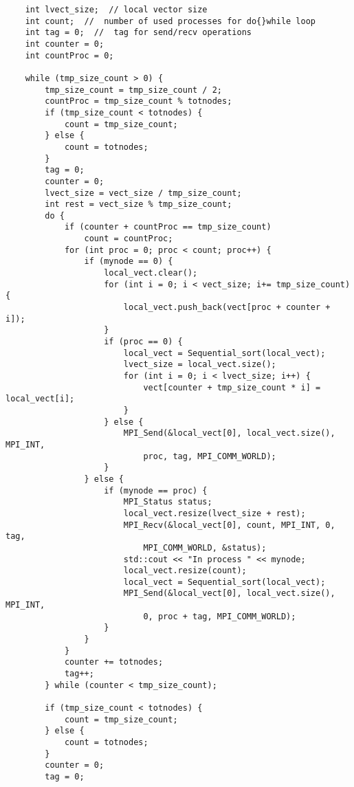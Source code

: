 \documentclass{report}
\begin{document}
\begin{verbatim}
    int lvect_size;  // local vector size
    int count;  //  number of used processes for do{}while loop
    int tag = 0;  //  tag for send/recv operations
    int counter = 0;
    int countProc = 0;

    while (tmp_size_count > 0) {
        tmp_size_count = tmp_size_count / 2;
        countProc = tmp_size_count % totnodes;
        if (tmp_size_count < totnodes) {
            count = tmp_size_count;
        } else {
            count = totnodes;
        }
        tag = 0;
        counter = 0;
        lvect_size = vect_size / tmp_size_count;
        int rest = vect_size % tmp_size_count;
        do {
            if (counter + countProc == tmp_size_count)
                count = countProc;
            for (int proc = 0; proc < count; proc++) {
                if (mynode == 0) {
                    local_vect.clear();
                    for (int i = 0; i < vect_size; i+= tmp_size_count) {
                        local_vect.push_back(vect[proc + counter + i]);
                    }
                    if (proc == 0) {
                        local_vect = Sequential_sort(local_vect);
                        lvect_size = local_vect.size();
                        for (int i = 0; i < lvect_size; i++) {
                            vect[counter + tmp_size_count * i] = local_vect[i];
                        }
                    } else {
                        MPI_Send(&local_vect[0], local_vect.size(), MPI_INT, 
                            proc, tag, MPI_COMM_WORLD);
                    }
                } else {
                    if (mynode == proc) {
                        MPI_Status status;
                        local_vect.resize(lvect_size + rest);
                        MPI_Recv(&local_vect[0], count, MPI_INT, 0, tag, 
                            MPI_COMM_WORLD, &status);
                        std::cout << "In process " << mynode;
                        local_vect.resize(count);
                        local_vect = Sequential_sort(local_vect);
                        MPI_Send(&local_vect[0], local_vect.size(), MPI_INT, 
                            0, proc + tag, MPI_COMM_WORLD);
                    }
                }
            }
            counter += totnodes;
            tag++;
        } while (counter < tmp_size_count);

        if (tmp_size_count < totnodes) {
            count = tmp_size_count;
        } else {
            count = totnodes;
        }
        counter = 0;
        tag = 0;


\end{verbatim}
\end{document}
